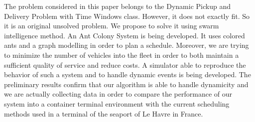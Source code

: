 \documentclass[journal]{IEEEtran}
\begin{document}
The problem considered in this paper belongs to the Dynamic Pickup and Delivery Problem with Time Windows class. However, it does not exactly fit. So it is an original unsolved problem. We propose to solve it using swarm intelligence method. An Ant Colony System is being developed. It uses colored ants and a graph modelling in order to plan a schedule. Moreover, we are trying to minimize the number of vehicles into the fleet in order to both maintain a sufficient quality of service and reduce costs. A simulator able to reproduce the behavior of such a system and to handle dynamic events is being developed. The preliminary results confirm that our algorithm is able to handle dynamicity and we are actually collecting data in order to compare the performance of our system into a container terminal environment with the current scheduling methods used in a terminal of the seaport of Le Havre in France.
		



\end{document}
